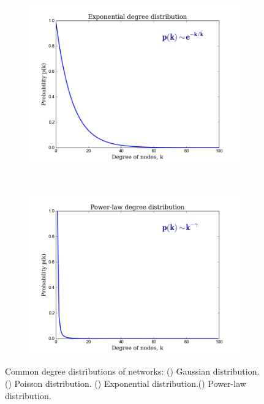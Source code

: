 \documentclass[10pt,a4paper]{article}
\begin{document}
\begin{figure}[H]
\begin{subfigure}[b]{0.45\textwidth}
		\includegraphics[width=\textwidth]{images/exp.png}
		\caption{}
		\label{expo}
	\end{subfigure}~
	\begin{subfigure}[b]{0.45\textwidth}
		\includegraphics[width=\textwidth]{images/p-law.png}
		\caption{}
		\label{powerlaw}
	\end{subfigure}
	\caption{Common degree distributions of networks: () Gaussian distribution. () Poisson distribution. () Exponential distribution.() Power-law distribution.}
	\label{distribution}
\end{figure} 
\end{document}

